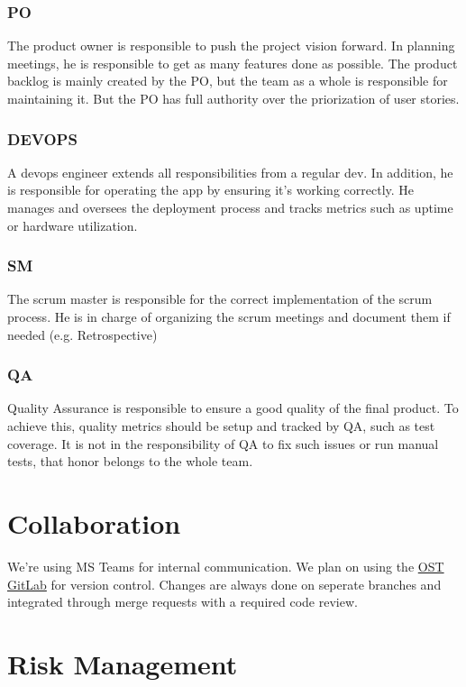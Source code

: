 \subsubsection*{PO}
The product owner is responsible to push the project vision forward.
In planning meetings, he is responsible to get as many features done as possible.
The product backlog is mainly created by the PO, but the team as a whole is responsible for maintaining it.
But the PO has full authority over the priorization of user stories.

\subsubsection*{DEVOPS}
A devops engineer extends all responsibilities from a regular dev.
In addition, he is responsible for operating the app by ensuring it's working correctly.
He manages and oversees the deployment process and tracks metrics such as uptime or hardware utilization.

\subsubsection*{SM}
The scrum master is responsible for the correct implementation of the scrum process.
He is in charge of organizing the scrum meetings and document them if needed (e.g. Retrospective)

\subsubsection*{QA}
Quality Assurance is responsible to ensure a good quality of the final product.
To achieve this, quality metrics should be setup and tracked by QA, such as test coverage.
It is not in the responsibility of QA to fix such issues or run manual tests, that honor belongs to the whole team.

\section{Collaboration}

We're using MS Teams for internal communication.
We plan on using the \href{https://gitlab.ost.ch/SEProj/2022-FS/g02-jasstracker/jasstracker}{OST GitLab} for version control.
Changes are always done on seperate branches and integrated through merge requests with a required code review.

\section{Risk Management}

